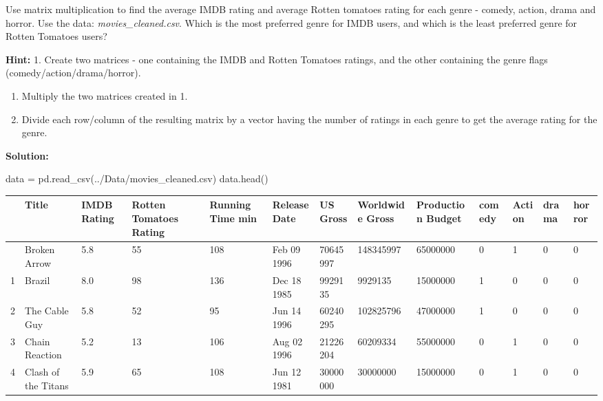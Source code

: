 \documentclass[
  letterpaper,
  DIV=11,
  numbers=noendperiod]{scrreprt}
\newenvironment{Shaded}{\begin{snugshade}}{\end{snugshade}}
\newcommand{\NormalTok}[1]{\textcolor[rgb]{0.00,0.23,0.31}{#1}}
\newcommand{\OperatorTok}[1]{\textcolor[rgb]{0.37,0.37,0.37}{#1}}
\newcommand{\StringTok}[1]{\textcolor[rgb]{0.13,0.47,0.30}{#1}}
\begin{document}
Use matrix multiplication to find the average IMDB rating and average
Rotten tomatoes rating for each genre - comedy, action, drama and
horror. Use the data: \emph{movies\_cleaned.csv}. Which is the most
preferred genre for IMDB users, and which is the least preferred genre
for Rotten Tomatoes users?

\textbf{Hint:} 1. Create two matrices - one containing the IMDB and
Rotten Tomatoes ratings, and the other containing the genre flags
(comedy/action/drama/horror).

\begin{enumerate}
\def\labelenumi{\arabic{enumi}.}
\setcounter{enumi}{1}
\item
  Multiply the two matrices created in 1.
\item
  Divide each row/column of the resulting matrix by a vector having the
  number of ratings in each genre to get the average rating for the
  genre.
\end{enumerate}

\textbf{Solution:}

\begin{Shaded}
\begin{Highlighting}[]
\NormalTok{data }\OperatorTok{=}\NormalTok{ pd.read\_csv(}\StringTok{\textquotesingle{}../Data/movies\_cleaned.csv\textquotesingle{}}\NormalTok{)}
\NormalTok{data.head()}
\end{Highlighting}
\end{Shaded}

\begin{longtable}[]{@{}lllllllllllll@{}}
\toprule\noalign{}
& Title & IMDB Rating & Rotten Tomatoes Rating & Running Time min &
Release Date & US Gross & Worldwide Gross & Production Budget & comedy &
Action & drama & horror \\
\midrule\noalign{}
\endhead
\bottomrule\noalign{}
\endlastfoot
0 & Broken Arrow & 5.8 & 55 & 108 & Feb 09 1996 & 70645997 & 148345997 &
65000000 & 0 & 1 & 0 & 0 \\
1 & Brazil & 8.0 & 98 & 136 & Dec 18 1985 & 9929135 & 9929135 & 15000000
& 1 & 0 & 0 & 0 \\
2 & The Cable Guy & 5.8 & 52 & 95 & Jun 14 1996 & 60240295 & 102825796 &
47000000 & 1 & 0 & 0 & 0 \\
3 & Chain Reaction & 5.2 & 13 & 106 & Aug 02 1996 & 21226204 & 60209334
& 55000000 & 0 & 1 & 0 & 0 \\
4 & Clash of the Titans & 5.9 & 65 & 108 & Jun 12 1981 & 30000000 &
30000000 & 15000000 & 0 & 1 & 0 & 0 \\
\end{longtable}
\end{document}
